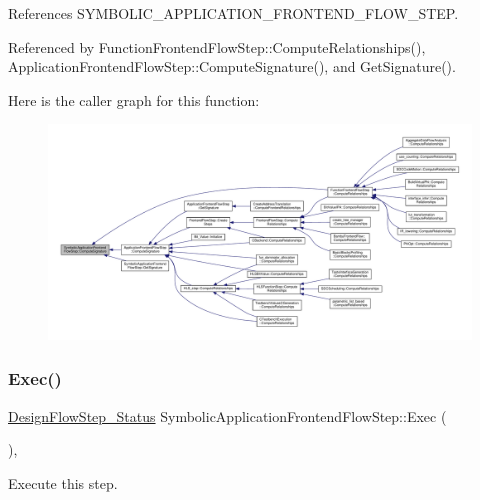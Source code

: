 References S\+Y\+M\+B\+O\+L\+I\+C\+\_\+\+A\+P\+P\+L\+I\+C\+A\+T\+I\+O\+N\+\_\+\+F\+R\+O\+N\+T\+E\+N\+D\+\_\+\+F\+L\+O\+W\+\_\+\+S\+T\+EP.



Referenced by Function\+Frontend\+Flow\+Step\+::\+Compute\+Relationships(), Application\+Frontend\+Flow\+Step\+::\+Compute\+Signature(), and Get\+Signature().

Here is the caller graph for this function\+:
\nopagebreak
\begin{figure}[H]
\begin{center}
\leavevmode
\includegraphics[width=350pt]{d5/dad/classSymbolicApplicationFrontendFlowStep_aedd0e776b99f86abc0f35695c0a423a3_icgraph}
\end{center}
\end{figure}
\mbox{\label{classSymbolicApplicationFrontendFlowStep_ad75eb18151a95dc374523c24ec78a1b5}} 
\subsubsection{\texorpdfstring{Exec()}{Exec()}}
{\footnotesize\ttfamily \hyperlink{design__flow__step_8hpp_afb1f0d73069c26076b8d31dbc8ebecdf}{Design\+Flow\+Step\+\_\+\+Status} Symbolic\+Application\+Frontend\+Flow\+Step\+::\+Exec (\begin{DoxyParamCaption}{ }\end{DoxyParamCaption})\hspace{0.3cm}{\ttfamily [override]}, {\ttfamily [virtual]}}



Execute this step. 

